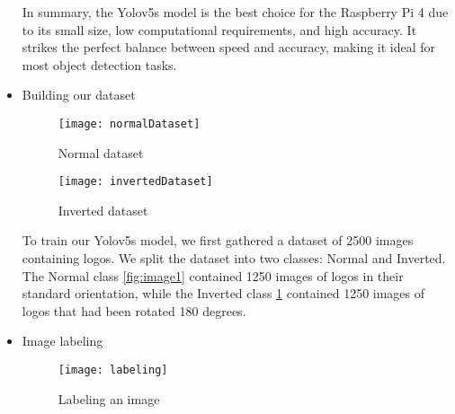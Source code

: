 \begin{itemize}
In summary, the Yolov5s model is the best choice for the Raspberry Pi 4 due to its small size, low computational requirements, and high accuracy. It strikes the perfect balance between speed and accuracy, making it ideal for most object detection tasks.


\item{Building our dataset}
\FloatBarrier
\begin{figure}[ht]
  \centering
  \begin{minipage}[b]{0.45\linewidth}
    \texttt{[image: normalDataset]}
    \caption{Normal dataset}
    \label{fig:image1}
  \end{minipage}
  \hfill
  \begin{minipage}[b]{0.45\linewidth}
    \texttt{[image: invertedDataset]}
    \caption{Inverted dataset}
    \label{fig:image2}
  \end{minipage}
\end{figure}
\FloatBarrier

To train our Yolov5s model, we first gathered a dataset of 2500 images containing logos. We split the dataset into two classes: Normal and Inverted. The Normal class \ref{fig:image1} contained 1250 images of logos in their standard orientation, while the Inverted class \ref{fig:image2} contained 1250 images of logos that had been rotated 180 degrees.

\item{Image labeling}
\FloatBarrier
\begin{figure}[ht]
  \centering
    \texttt{[image: labeling]}
    \caption{Labeling an image}
    \label{fig:labeling}



\end{figure}
\end{itemize}
